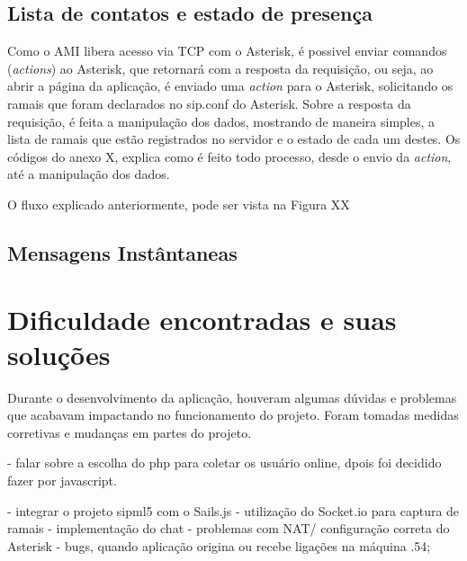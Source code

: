 \documentclass[ruledheader]{abnt} %
\begin{document}
  

\subsection{Lista de contatos e estado de presença}
\label{ss_listaContatoEestadoPresenca} %

  Como o AMI libera acesso via TCP com o Asterisk, é possivel enviar comandos (\textit{actions}) ao Asterisk, que retornará com a resposta da requisição, ou seja, ao abrir a página da aplicação, é enviado uma \textit{action} para o Asterisk, solicitando os ramais que foram declarados no sip.conf do Asterisk. Sobre a resposta da requisição, é feita a manipulação dos dados, mostrando de maneira simples, a lista de ramais que estão registrados no servidor e o estado de cada um destes. Os códigos do anexo X, explica como é feito todo processo, desde o envio da \textit{action}, até a manipulação dos dados.
  
  O fluxo explicado anteriormente, pode ser vista na Figura XX

  
  
\subsection{Mensagens Instântaneas}
\label{ss_mensagensIntantaneas} %


\section{Dificuldade encontradas e suas soluções}
\label{s_dificuldadeEsolucoes} %

Durante o desenvolvimento da aplicação, houveram algumas dúvidas e problemas que acabavam impactando no funcionamento do projeto. Foram tomadas medidas corretivas e mudanças em partes do projeto.

- falar sobre a escolha do php para coletar os usuário online, dpois foi decidido fazer por javascript.

- integrar o projeto sipml5 com o Sails.js
- utilização do Socket.io para captura de ramais
- implementação do chat
- problemas com NAT/ configuração correta do Asterisk
- bugs, quando aplicação origina ou recebe ligações na máquina .54;
\end{document}
